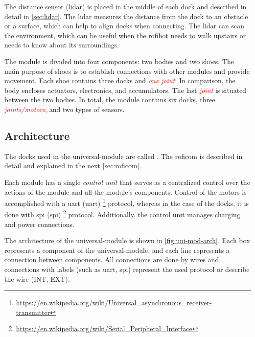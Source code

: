 \documentclass[
  digital,     %
  oneside,     %
  nosansbold,  %
  nocolorbold, %
  nolof,         %
  nolot,         %
]{fithesis4}
\newcommand{\TODO}[1]{\textcolor{red}{\textit{#1}}}
\begin{document}
The distance sensor (\acrshort{lidar}) is placed in the middle of each dock and described in detail in \autoref{sec:lidar}. The \acrshort{lidar} measures the distance from the dock to an obstacle or a surface, which can help to align docks when connecting. The \acrshort{lidar} can scan the environment, which can be useful when the \gls{rofibot} needs to walk upstairs or needs to know about its surroundings.

The module is divided into four components: two bodies and two shoes. The main purpose of shoes is to establish connections with other modules and provide movement. Each shoe contains three docks and \TODO{one joint}. In comparison, the body encloses actuators, electronics, and accumulators. The last \TODO{joint} is situated between the two bodies. In total, the module contains six docks, three \TODO{joints/motors}, and two types of sensors.


\subsection{ Architecture }

The docks used in the \gls{universal-module} are called . The \acrshort{roficom} is described in detail and explained in the next \autoref{sec:roficom}.

Each module has a single \emph{control unit} that serves as a centralized control over the actions of the module and all the module's components. Control of the motors is accomplished with a \acrshort{uart} (\acrlong{uart}) \footnote{\url{https://en.wikipedia.org/wiki/Universal_asynchronous_receiver-transmitter}} protocol, whereas in the case of the docks, it is done with \acrshort{spi} (\acrlong{spi}) \footnote{\url{https://en.wikipedia.org/wiki/Serial_Peripheral_Interface}} protocol. Additionally, the control unit manages charging and power connections.

The architecture of the \gls{universal-module} is shown in \autoref{fig:uni-mod-arch}. Each box represents a component of the \gls{universal-module}, and each line represents a connection between components. All connections are done by wires and connections with labels (such as \acrshort{uart}, \acrshort{spi}) represent the used protocol or describe the wire (INT, EXT). 
\end{document}
